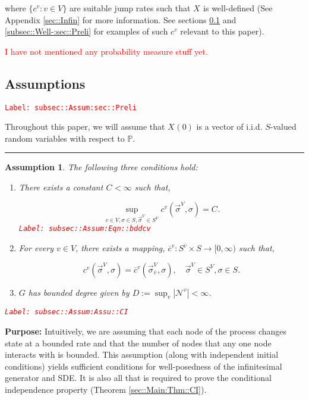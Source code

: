 \documentclass[12pt]{article}
\newcommand{\mb}{\mathbb}
\newcommand{\mc}{\mathcal}
\newcommand{\ra}{\rightarrow}
\newcommand{\ov}{\overline}
\newcommand{\tr}{\textcolor{red}}
\newcommand{\labe}[1]{\tr{\texttt{Label: #1}}}
\newcommand{\purpose}{\textbf{Purpose: }}
\newcommand{\lin}{\rule{\linewidth}{0.4 pt}}
\newcommand{\pr}{\mb{P}}							%
\newcommand{\defeq}{:=}								%
\renewcommand{\v}{v}							%
\renewcommand{\S}{S}							%
\newcommand{\s}{\sigma}							%
\newcommand{\sv}{\vec{\s}}						%
\newcommand{\X}{X}								%
\newcommand{\IGr}{c}							%
\newcommand{\neigh}{\mc{N}}						%
\newcommand{\vind}[1]{^{#1}}					%
\newcommand{\carp}[1]{^{#1}}					%
\newcommand{\vsi}[1]{^{#1}}						%
\newcommand{\cind}[1]{_{#1}}					%
\newcommand{\cl}{\ov}							%
\newcommand{\tp}[1]{(#1)}						%
\newcommand{\tip}[1]{#1}						%
\newcommand{\const}{C}							%
\newcommand{\degr}{D}							%
\newcommand{\IGrg}{\ov{c}}						%
\newcommand{\indx}[1]{_{#1}}					%
\newtheorem{assu}[thms]{Assumption}
\begin{document}
where \(\{\IGr\vind{\v}:\v\in V\}\) are suitable jump rates such that \(\X\cind{}\tip{}\) is well-defined (See Appendix \ref{sec::Infin} for more information. See sections \ref{subsec::Assum:sec::Preli} and \ref{subsec::Well-:sec::Preli} for examples of such \(\IGr\vind{\v}\) relevant to this paper). 

\tr{I have not mentioned any probability measure stuff yet.}

\subsection{Assumptions}
\label{subsec::Assum:sec::Preli}\labe{subsec::Assum:sec::Preli}

Throughout this paper, we will assume that \(\X\cind{}\tp{0}\) is a vector of i.i.d. \(\S\)-valued random variables with respect to \(\pr\).

\lin

\begin{assu}
The following three conditions hold:
\begin{enumerate}
\item There exists a constant \(\const\indx{} < \infty\) such that,

\begin{equation}
\sup_{\v\in V,\s \in \S,\sv\cind{}\vsi{V}\in \S\carp{V}} \IGr\vind{\v}(\sv\cind{}\vsi{V},\s) = \const\indx{}.
\label{subsec::Assum:Eqn::bddcv}
\end{equation}
\labe{subsec::Assum:Eqn::bddcv}

\item For every \(\v\in V\), there exists a mapping, \(\IGrg\vind{\v}:\S\carp{\cl{\v}} \times \S \ra [0,\infty)\) such that,

\[\IGr\vind{\v}(\sv\cind{}\vsi{V},\s) = \IGrg\vind{\v}(\sv\cind{\cl{\v}}\vsi{V},\s), \quad \sv\vsi{V} \in \S\carp{V},\s\in \S.\]

\item \(G\) has bounded degree given by \(\degr \defeq \sup_\v |\neigh\vind{\v}| < \infty\).
\end{enumerate}
\label{subsec::Assum:Assu::CI}\labe{subsec::Assum:Assu::CI}
\end{assu}

\purpose Intuitively, we are assuming that each node of the process changes state at a bounded rate and that the number of nodes that any one node interacts with is bounded. This assumption (along with independent initial conditions) yields sufficient conditions for well-posedness of the infinitesimal generator and SDE. It is also all that is required to prove the conditional independence property (Theorem \ref{sec::Main:Thm::CI}). 
\end{document}
